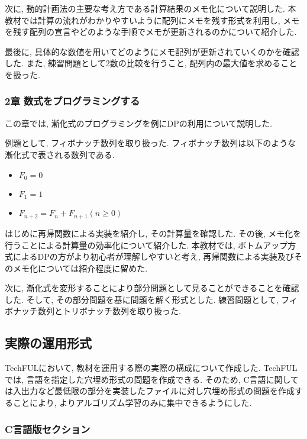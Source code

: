 次に, 動的計画法の主要な考え方である計算結果のメモ化について説明した. 
本教材では計算の流れがわかりやすいように配列にメモを残す形式を利用し, メモを残す配列の宣言やどのような手順でメモが更新されるのかについて紹介した. 

最後に, 具体的な数値を用いてどのようにメモ配列が更新されていくのかを確認した. 
また, 練習問題として2数の比較を行うこと, 配列内の最大値を求めることを扱った. 

\clearpage

\subsubsection{2章 数式をプログラミングする}
この章では, 漸化式のプログラミングを例にDPの利用について説明した. 

例題として, フィボナッチ数列を取り扱った. フィボナッチ数列は以下のような漸化式で表される数列である. 

\begin{itemize}
    \item $F_0 = 0$
    \item $F_1 = 1$
    \item $F_{n+2} = F_n + F_{n+1}(n \geq 0)$
\end{itemize}

はじめに再帰関数による実装を紹介し, その計算量を確認した. 
その後, メモ化を行うことによる計算量の効率化について紹介した. 
本教材では, ボトムアップ方式によるDPの方がより初心者が理解しやすいと考え, 再帰関数による実装及びそのメモ化については紹介程度に留めた. 

次に, 漸化式を変形することにより部分問題として見ることができることを確認した. 
そして, その部分問題を基に問題を解く形式とした. 
練習問題として, フィボナッチ数列とトリボナッチ数列を取り扱った. 

\subsection{実際の運用形式}

TechFULにおいて, 教材を運用する際の実際の構成について作成した. 
TechFULでは, 言語を指定した穴埋め形式の問題を作成できる. 
そのため, C言語に関しては入出力など最低限の部分を実装したファイルに対し穴埋め形式の問題を作成することにより, よりアルゴリズム学習のみに集中できるようにした. 

\clearpage

\subsubsection{C言語版セクション}

